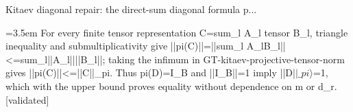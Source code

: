 \documentclass{article}
\newcommand{\step}[1]{\par\noindent\hangindent=3.5em\hangafter=1%
  \makebox[3.5em][l]{\textbf{#1.}}}
\newcommand{\steptag}[1]{\hfill{\small\textsf{[#1]}}}
\begin{document}
\begin{proofbox}{Kitaev diagonal repair: the direct-sum diagonal formula p...}
\step{1.2.5.2} For every finite tensor representation C=sum\_l A\_l tensor B\_l, triangle inequality and submultiplicativity give ||pi(C)||=||sum\_l A\_lB\_l||<=sum\_l||A\_l||||B\_l||; taking the infimum in GT-kitaev-projective-tensor-norm gives ||pi(C)||<=||C||\_pi. Thus pi(D)=I\_B and ||I\_B||=1 imply ||D|$|\_pi\rangle$=1, which with the upper bound proves equality without dependence on m or d\_r. \steptag{validated} \\[4pt]
\end{proofbox}
\end{document}
